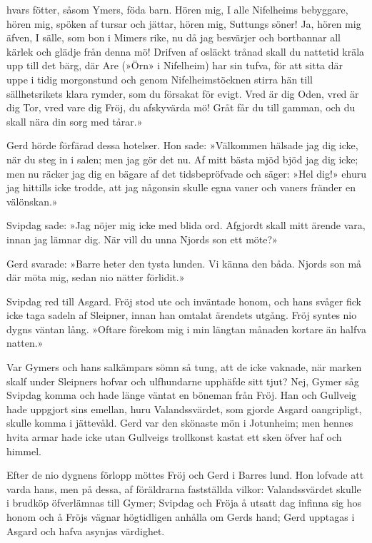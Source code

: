 hvars fötter, såsom Ymers, föda barn. Hören mig, I alle Nifelheims
bebyggare, hören mig, spöken af tursar och jättar, hören mig, Suttungs
söner! Ja, hören mig äfven, I sälle, som bon i Mimers rike, nu då jag
besvärjer och bortbannar all kärlek och glädje från denna mö! Drifven af
osläckt trånad skall du nattetid kräla upp till det bärg, där Are (»Örn»
i Nifelheim) har sin tufva, för att sitta där uppe i tidig morgonstund
och genom Nifelheimstöcknen stirra hän till sällhetsrikets klara rymder,
som du försakat för evigt. Vred är dig Oden, vred är dig Tor, vred vare
dig Fröj, du afskyvärda mö! Gråt får du till gamman, och du skall nära
din sorg med tårar.»

Gerd hörde förfärad dessa hotelser. Hon sade: »Välkommen hälsade jag dig
icke, när du steg in i salen; men jag gör det nu. Af mitt bästa mjöd
bjöd jag dig icke; men nu räcker jag dig en bägare af det tidsbepröfvade
och säger: »Hel dig!» ehuru jag hittills icke trodde, att jag någonsin
skulle egna vaner och vaners fränder en välönskan.»

Svipdag sade: »Jag nöjer mig icke med blida ord. Afgjordt skall mitt
ärende vara, innan jag lämnar dig. När vill du unna Njords son ett
möte?»

Gerd svarade: »Barre heter den tysta lunden. Vi känna den båda. Njords
son må där möta mig, sedan nio nätter förlidit.»

Svipdag red till Asgard. Fröj stod ute och inväntade honom, och hans
svåger fick icke taga sadeln af Sleipner, innan han omtalat ärendets
utgång. Fröj syntes nio dygns väntan lång. »Oftare förekom mig i min
längtan månaden kortare än halfva natten.»

Var Gymers och hans salkämpars sömn så tung, att de icke vaknade, när
marken skalf under Sleipners hofvar och ulfhundarne upphäfde sitt tjut?
Nej, Gymer såg Svipdag komma och hade länge väntat en böneman från Fröj.
Han och Gullveig hade uppgjort sins emellan, huru Valandssvärdet, som
gjorde Asgard oangripligt, skulle komma i jättevåld. Gerd var den
skönaste mön i Jotunheim; men hennes hvita armar
hade icke utan Gullveigs trollkonst kastat ett sken öfver haf och
himmel.

Efter de nio dygnens förlopp möttes Fröj och Gerd i Barres lund. Hon
lofvade att varda hans, men på dessa, af föräldrarna fastställda vilkor:
Valandssvärdet skulle i brudköp öfverlämnas till Gymer; Svipdag och
Fröja å utsatt dag infinna sig hos honom och å Fröjs vägnar högtidligen
anhålla om Gerds hand; Gerd upptagas i Asgard och hafva asynjas
värdighet.

